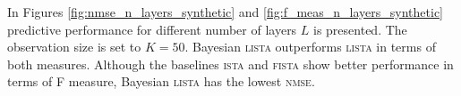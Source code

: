 \documentclass{article}
\begin{document}
  In Figures \ref{fig:nmse_n_layers_synthetic} and \ref{fig:f_meas_n_layers_synthetic} predictive performance for different number of layers $L$ is presented. The observation size is set to $K=50$. Bayesian \textsc{lista} outperforms \textsc{lista} in terms of both measures. Although the baselines \textsc{ista} and \textsc{fista} show better performance in terms of F measure, Bayesian \textsc{lista} has the lowest \textsc{nmse}.
  
  \begin{figure}[h]
  \centering
  \\[-13pt]

\end{figure}
\end{document}
